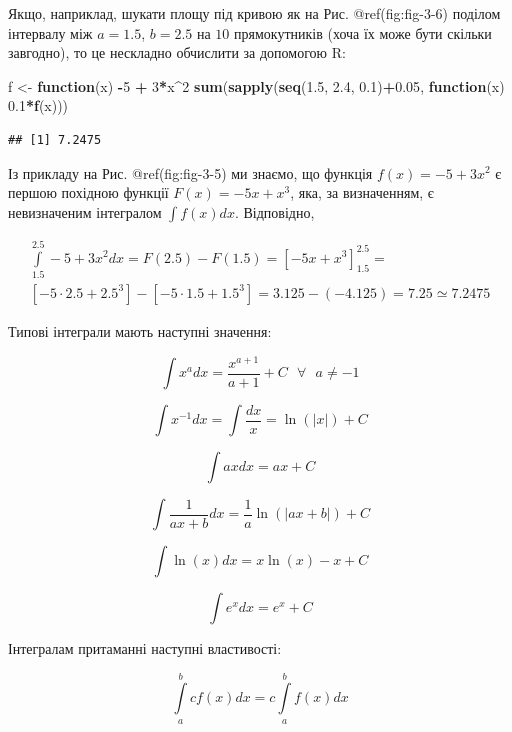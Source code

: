 \documentclass[
  11pt,
]{book}
\newenvironment{Shaded}{\begin{snugshade}}{\end{snugshade}}
\newcommand{\ControlFlowTok}[1]{\textcolor[rgb]{0.13,0.29,0.53}{\textbf{#1}}}
\newcommand{\DecValTok}[1]{\textcolor[rgb]{0.00,0.00,0.81}{#1}}
\newcommand{\FloatTok}[1]{\textcolor[rgb]{0.00,0.00,0.81}{#1}}
\newcommand{\FunctionTok}[1]{\textcolor[rgb]{0.13,0.29,0.53}{\textbf{#1}}}
\newcommand{\NormalTok}[1]{#1}
\newcommand{\OtherTok}[1]{\textcolor[rgb]{0.56,0.35,0.01}{#1}}
\newcommand{\SpecialCharTok}[1]{\textcolor[rgb]{0.81,0.36,0.00}{\textbf{#1}}}
\begin{document}
Якщо, наприклад, шукати площу під кривою як на Рис. @ref(fig:fig-3-6)
поділом інтервалу між \(a = 1.5\), \(b = 2.5\) на \(10\) прямокутників
(хоча їх може бути скільки завгодно), то це нескладно обчислити за
допомогою R:

\begin{Shaded}
\begin{Highlighting}[]
\NormalTok{f }\OtherTok{\textless{}{-}} \ControlFlowTok{function}\NormalTok{(x) }\SpecialCharTok{{-}}\DecValTok{5} \SpecialCharTok{+} \DecValTok{3}\SpecialCharTok{*}\NormalTok{x}\SpecialCharTok{\^{}}\DecValTok{2}
\FunctionTok{sum}\NormalTok{(}\FunctionTok{sapply}\NormalTok{(}\FunctionTok{seq}\NormalTok{(}\FloatTok{1.5}\NormalTok{, }\FloatTok{2.4}\NormalTok{, }\FloatTok{0.1}\NormalTok{)}\SpecialCharTok{+}\FloatTok{0.05}\NormalTok{, }\ControlFlowTok{function}\NormalTok{(x) }\FloatTok{0.1}\SpecialCharTok{*}\FunctionTok{f}\NormalTok{(x)))}
\end{Highlighting}
\end{Shaded}

\begin{verbatim}
## [1] 7.2475
\end{verbatim}

Із прикладу на Рис. @ref(fig:fig-3-5) ми знаємо, що функція
\(f(x) = -5 + 3x^2\) є першою похідною функції \(F(x) = -5x + x^3\),
яка, за визначенням, є невизначеним інтегралом \(\int f(x)dx\).
Відповідно,

\[
\begin{aligned}
  \int\limits_{1.5}^{2.5}-5 + 3x^2 dx = F(2.5) - F(1.5) = \left[ -5x + x^3 \right]_{1.5}^{2.5} = \\ [-5 \cdot 2.5 + 2.5^3] - [-5 \cdot 1.5 + 1.5^3] = 3.125 - (-4.125) = 7.25 \simeq 7.2475
\end{aligned}
\]

Типові інтеграли мають наступні значення:

\[\int x^a dx = \frac{x^{a+1}}{a+1} + C \text{ } \forall \text{ } a \neq -1\]

\[\int x^{-1} dx = \int \frac{dx}{x} = \ln(|x|) + C\]

\[\int axdx = ax + C\]

\[\int \frac{1}{ax + b}dx = \frac{1}{a} \ln(|ax+b|) + C\]

\[\int \ln(x) dx = x \ln(x) -x + C\]

\[\int e^x dx = e^x + C\]

Інтегралам притаманні наступні властивості:

\[\int \limits_a^b c f(x) dx = c \int \limits_a^b f(x) dx\]
\end{document}
